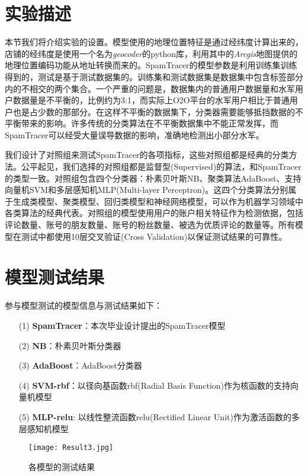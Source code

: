 \section{实验描述}

本节我们将介绍实验的设置。模型使用的地理位置特征是通过经纬度计算出来的，店铺的经纬度是使用一个名为\emph{geocoder}的python库，利用其中的\emph{Arcgis}地图提供的地理位置编码功能从地址转换而来的。SpamTracer的模型参数是利用训练集训练得到的，测试是基于测试数据集的。训练集和测试数据集是数据集中包含标签部分内的不相交的两个集合。一个严重的问题是，数据集内的普通用户数据量和水军用户数据量是不平衡的，比例约为3:1，而实际上O2O平台的水军用户相比于普通用户也是占少数的那部分。在这样不平衡的数据集下，分类器需要能够抵挡数据的不平衡带来的影响。许多传统的分类算法在不平衡数据集中不能正常发挥，而SpamTracer可以经受大量误导数据的影响，准确地检测出小部分水军。

我们设计了对照组来测试SpamTracer的各项指标，这些对照组都是经典的分类方法。公平起见，我们选择的对照组都是监督型(Supervised)的算法，和SpamTracer的类型一致。对照组包含四个分类器：朴素贝叶斯NB、聚类算法AdaBoost、支持向量机SVM和多层感知机MLP(Multi-layer Perceptron)。这四个分类算法分别属于生成类模型、聚类模型、回归类模型和神经网络模型，可以作为机器学习领域中各类算法的经典代表。对照组的模型使用用户的账户相关特征作为检测依据，包括评论数量、账号的朋友数量、账号的粉丝数量、被选为优质评论的数量等。所有模型在测试中都使用10层交叉验证(Cross Validation)以保证测试结果的可靠性。


\section{模型测试结果}

参与模型测试的模型信息与测试结果如下：

\begin{enumerate}	
	\item[(1)] \textbf{SpamTracer}：本次毕业设计提出的SpamTracer模型
	\item[(2)] \textbf{NB}：朴素贝叶斯分类器
	\item[(3)] \textbf{AdaBoost}：AdaBoost分类器
	\item[(4)] \textbf{SVM-rbf}：以径向基函数rbf(Radial Basis Function)作为核函数的支持向量机模型
	\item[(5)] \textbf{MLP-relu}: 以线性整流函数relu(Rectified Linear Unit)作为激活函数的多层感知机模型
\end{enumerate}


\begin{figure}[htbp]
	\centering
	\begin{minipage}[htbp]{0.8\textwidth}
		\centering
		\texttt{[image: Result3.jpg]}
		\caption[各模型的测试结果]
		{各模型的测试结果\label{fig:result}}		
	\end{minipage}     
\end{figure}


